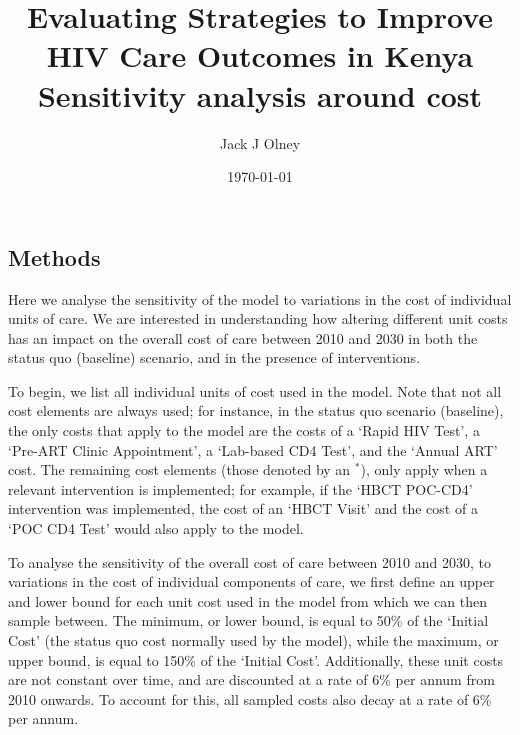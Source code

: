 \documentclass[a4paper]{article}
\begin{document}

\title{\textbf{Evaluating Strategies to Improve HIV Care Outcomes in Kenya} \\ Sensitivity analysis around cost}

\author[1]{Jack J Olney}


\date{\today{}}

\maketitle{}

\subsection*{Methods}
\label{Methods}

Here we analyse the sensitivity of the model to variations in the cost of individual units of care. We are interested in understanding how altering different unit costs has an impact on the overall cost of care between 2010 and 2030 in both the status quo (baseline) scenario, and in the presence of interventions.

To begin, we list all individual units of cost used in the model. Note that not all cost elements are always used; for instance, in the status quo scenario (baseline), the only costs that apply to the model are the costs of a `Rapid HIV Test', a `Pre-ART Clinic Appointment', a `Lab-based CD4 Test', and the `Annual ART' cost. The remaining cost elements (those denoted by an $^*$), only apply when a relevant intervention is implemented; for example, if the `HBCT POC-CD4' intervention was implemented, the cost of an `HBCT Visit' and the cost of a `POC CD4 Test' would also apply to the model.

To analyse the sensitivity of the overall cost of care between 2010 and 2030, to variations in the cost of individual components of care, we first define an upper and lower bound for each unit cost used in the model from which we can then sample between. The minimum, or lower bound, is equal to 50\% of the `Initial Cost' (the status quo cost normally used by the model), while the maximum, or upper bound, is equal to 150\% of the `Initial Cost'. Additionally, these unit costs are not constant over time, and are discounted at a rate of 6\% per annum from 2010 onwards. To account for this, all sampled costs also decay at a rate of 6\% per annum.
\end{document}
